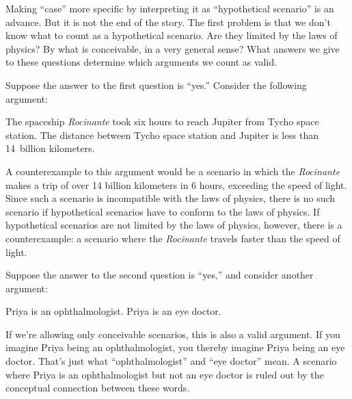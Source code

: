 Making ``case'' more specific by interpreting it as ``hypothetical scenario'' is an advance. But it is not the end of the story.  The first problem is that we don't know what to count as a hypothetical scenario. Are they limited by the laws of physics? By what is conceivable, in a very general sense?  What answers we give to these questions determine which arguments we count as valid.

Suppose the answer to the first question is ``yes.'' Consider the following argument:
	\begin{earg}
		\prem The spaceship \emph{Rocinante} took six hours to reach Jupiter from Tycho space station.
		\conc The distance between Tycho space station and Jupiter is less than 14~billion kilometers.
	\end{earg}
A counterexample to this argument would be a scenario in which the \emph{Rocinante} makes a trip of over 14 billion kilometers in 6 hours, exceeding the speed of light. Since such a scenario is incompatible with the laws of physics, there is no such scenario if hypothetical scenarios have to conform to the laws of physics.  If hypothetical scenarios are not limited by the laws of physics, however, there is a counterexample: a scenario where the \emph{Rocinante} travels faster than the speed of light.

Suppose the answer to the second question is ``yes,'' and consider another argument:
	\begin{earg}
		\prem Priya is an ophthalmologist.
		\conc Priya is an eye doctor.
	\end{earg}
If we're allowing only conceivable scenarios, this is also a valid argument. If you imagine Priya being an ophthalmologist, you thereby imagine Priya being an eye doctor. That's just what ``ophthalmologist'' and ``eye doctor'' mean.  A scenario where Priya is an ophthalmologist but not an eye doctor is ruled out by the conceptual connection between these words.

